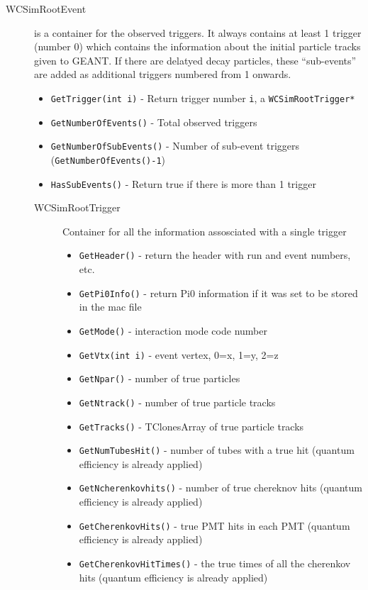 \begin{description}
  \item[WCSimRootEvent] is a container for the observed triggers. It always contains at least 1 trigger (number 0) which contains the information about the initial particle tracks given to GEANT.  If there are delatyed decay particles, these ``sub-events'' are added as additional triggers numbered from 1 onwards.  
  \begin{itemize}
  \item \texttt{GetTrigger(int i)} - Return trigger number \texttt{i}, a \texttt{WCSimRootTrigger*}
  \item \texttt{GetNumberOfEvents()} - Total observed triggers
  \item \texttt{GetNumberOfSubEvents()} - Number of sub-event triggers (\texttt{GetNumberOfEvents()-1})
  \item \texttt{HasSubEvents()} - Return true if there is more than 1 trigger
  \end{itemize}

  \begin{description}
    \item[WCSimRootTrigger] Container for all the information assosciated with a single trigger
    \begin{itemize}
    \item \texttt{GetHeader()} - return the header with run and event numbers, etc.
    \item \texttt{GetPi0Info()} - return Pi0 information if it was set to be stored in the mac file
    \item \texttt{GetMode()} - interaction mode code number
    \item \texttt{GetVtx(int i)} - event vertex, 0=x, 1=y, 2=z
    \item \texttt{GetNpar()} - number of true particles

    \item \texttt{GetNtrack()} - number of true particle tracks
    \item \texttt{GetTracks()} - TClonesArray of true particle tracks

    \item \texttt{GetNumTubesHit()} - number of tubes with a true hit (quantum efficiency is already applied)
    \item \texttt{GetNcherenkovhits()} - number of true chereknov hits (quantum efficiency is already applied)
    \item \texttt{GetCherenkovHits()} - true PMT hits in each PMT (quantum efficiency is already applied)
    \item \texttt{GetCherenkovHitTimes()} - the true times of all the cherenkov hits (quantum efficiency is already applied)


\end{itemize}
\end{description}
\end{description}
